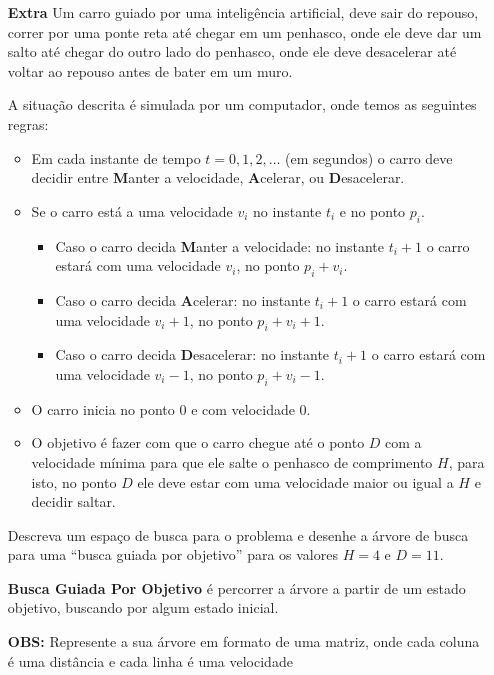 \documentclass[12pt]{article}
\begin{document}
\begin{enumerate}
\item[\textbf{Extra}] Um carro guiado por uma inteligência artificial, deve sair do repouso, correr por uma ponte reta até chegar em um penhasco, onde ele deve dar um salto até chegar do outro lado do penhasco, onde ele deve desacelerar até voltar ao repouso antes de bater em um muro. 

A situação descrita é simulada por um computador, onde temos as seguintes regras:

\begin{itemize}

\item Em cada instante de tempo $t = 0, 1, 2, \dots$ (em segundos) o carro deve decidir entre \textbf{M}anter a velocidade, \textbf{A}celerar, ou \textbf{D}esacelerar. 

\item Se o carro está a uma velocidade $v_i$ no instante $t_i$ e no ponto $p_i$. 

\begin{itemize}

\item Caso o carro decida \textbf{M}anter a velocidade: no instante $t_i+1$ o carro estará com uma velocidade $v_i$, no ponto $p_i+v_i$. 

\item Caso o carro decida \textbf{A}celerar: no instante $t_i+1$ o carro estará com uma velocidade $v_i+1$, no ponto $p_i+v_i+1$. 

\item Caso o carro decida \textbf{D}esacelerar: no instante $t_i+1$ o carro estará com uma velocidade $v_i-1$, no ponto $p_i+v_i-1$. 

\end{itemize}

\item O carro inicia no ponto $0$ e com velocidade $0$. 

\item O objetivo é fazer com que o carro chegue até o ponto $D$ com a velocidade mínima para que ele salte o penhasco de comprimento $H$, para isto, no ponto $D$ ele deve estar com uma velocidade maior ou igual a $H$ e decidir saltar.

\end{itemize}

Descreva um espaço de busca para o problema e desenhe a árvore de  busca para uma ``busca guiada por objetivo'' para os valores $H = 4$ e $D = 11$. 

\textbf{Busca Guiada Por Objetivo} é percorrer a árvore a partir de um estado objetivo, buscando por algum estado inicial.

\textbf{OBS:} Represente a sua árvore em formato de uma matriz, onde cada coluna é uma distância e cada linha é uma velocidade

\break















\end{enumerate}
\end{document}
